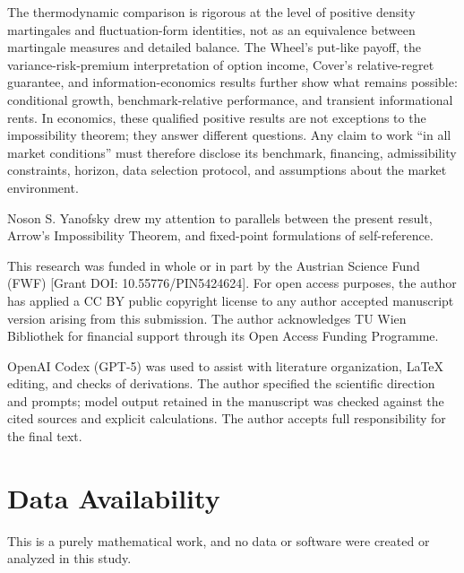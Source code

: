 \documentclass[aps,pra,reprint,superscriptaddress,amsmath,amssymb,floatfix]{revtex4-2}
\theoremstyle{plain}
\theoremstyle{definition}
\theoremstyle{remark}
\begin{document}
The thermodynamic comparison is rigorous at the level of positive density
martingales and fluctuation-form identities, not as an equivalence between
martingale measures and detailed balance. The Wheel's put-like payoff,
the variance-risk-premium interpretation of option income, Cover's
relative-regret guarantee, and information-economics results further show what
remains possible: conditional growth, benchmark-relative performance, and
transient informational rents. In economics, these qualified positive results
are not exceptions to the impossibility theorem; they answer different
questions. Any claim to work ``in all market conditions'' must therefore
disclose its benchmark, financing, admissibility constraints, horizon, data
selection protocol, and assumptions about the market environment.

\begin{acknowledgments}
Noson S. Yanofsky drew my attention to parallels between the present result,
Arrow's Impossibility Theorem, and fixed-point formulations of
self-reference.

This research was funded in whole or in part by the Austrian Science Fund
(FWF) [Grant DOI: 10.55776/PIN5424624]. For open access purposes, the author
has applied a CC BY public copyright license to any author accepted manuscript
version arising from this submission. The author acknowledges TU Wien
Bibliothek for financial support through its Open Access Funding Programme.

OpenAI Codex (GPT-5) was used to assist with literature organization, LaTeX
editing, and checks of derivations. The author specified the scientific
direction and prompts; model output retained in the manuscript was checked
against the cited sources and explicit calculations. The author accepts full
responsibility for the final text.
\end{acknowledgments}

\section*{Data Availability}
This is a purely mathematical work, and no data or software were created or
analyzed in this study.


\end{document}
